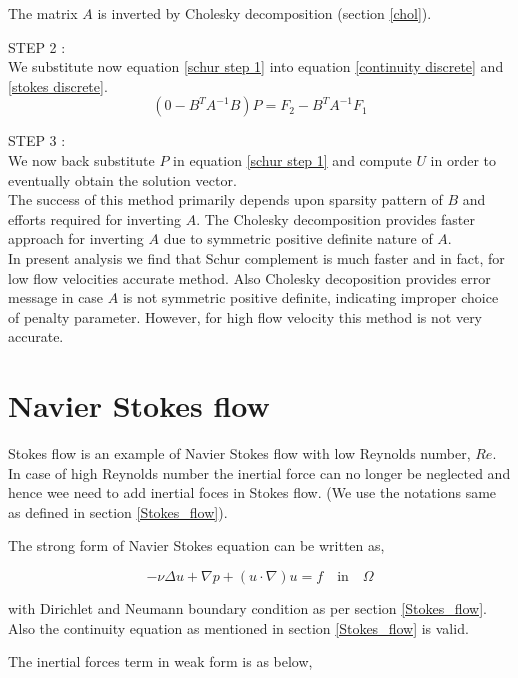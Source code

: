 \documentclass[a4paper,12pt]{book}
\begin{document}
The matrix $A$ is inverted by Cholesky decomposition (section \ref{chol}). 

STEP 2 : \\
We substitute now equation \eqref{schur step 1} into equation \eqref{continuity discrete} and \eqref{stokes discrete}.
\begin{equation}\label{schur step 2}
(0 - B^T A^{-1} B) P = F_2 - B^T A^{-1} F_1
\end{equation}

STEP 3 : \\
We now back substitute $P$ in equation \eqref{schur step 1} and compute $U$ in order to eventually obtain the solution vector.
\\

The success of this method primarily depends upon sparsity pattern of $B$ and efforts required for inverting $A$. The Cholesky decomposition provides faster approach for inverting $A$ due to symmetric positive definite nature of $A$. \\

In present analysis we find that Schur complement is much faster and in fact, for low flow velocities accurate method. Also Cholesky decoposition provides error message in case $A$ is not symmetric positive definite, indicating improper choice of penalty parameter. However, for high flow velocity this method is not very accurate. 

\section{Navier Stokes flow}

Stokes flow is an example of Navier Stokes flow with low Reynolds number, $Re$. In case of high Reynolds number the inertial force can no longer be neglected and hence wee need to add inertial foces in Stokes flow. (We use the notations same as defined in section \ref{Stokes_flow}).

The strong form of Navier Stokes equation can be written as,

\begin{equation} \label{navier_stokes_strong}
-\nu \Delta u + \nabla p + (u \cdot \nabla) u = f \quad \textrm{in} \quad \Omega
\end{equation}

with Dirichlet and Neumann boundary condition as per section \ref{Stokes_flow}. Also the continuity equation as mentioned in section \ref{Stokes_flow} is valid.

The inertial forces term in weak form is as below,
\end{document}

